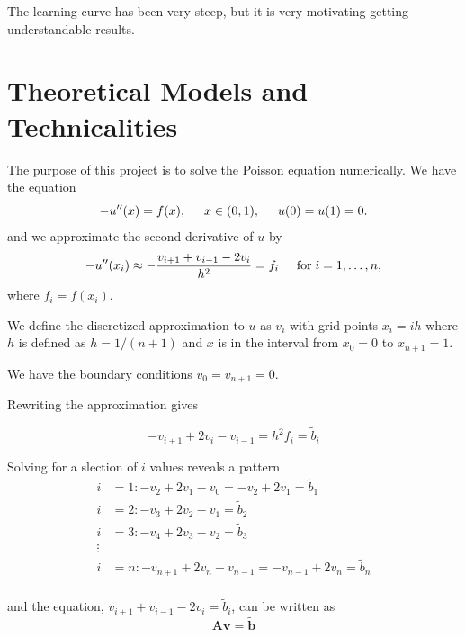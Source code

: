 \documentclass[%
oneside,                 %
final,                   %
10pt]{article}
\begin{document}
The learning curve has been very steep, but it is very motivating getting understandable results.


\section{Theoretical Models and Technicalities}

The purpose of this project is to solve the Poisson equation numerically. We have the equation
\begin{equation*}
-u''(x) = f(x), \hspace{0.5cm} x\in(0,1), \hspace{0.5cm} u(0) = u(1) = 0.
\end{equation*}
and we approximate the second derivative of $u$ by
\begin{equation*}
-u''(x_i)\approx -\frac{v_{i+1}+v_{i-1}-2v_i}{h^2} = f_i  \hspace{0.5cm} \mathrm{for} \hspace{0.1cm} i=1,\dots, n,
\end{equation*}
where $f_i=f(x_i)$.



We define the discretized approximation  to $u$ as $v_i$  with
grid points $x_i=ih$ where $h$ is defined as $h=1/(n+1)$ and $x$ is in the interval from $x_0=0$ to $x_{n+1}=1$.

We have the boundary conditions $v_0 = v_{n+1} = 0$.


Rewriting the approximation gives

\begin{equation*}
-v_{i+1}+2v_{i}-v_{i-1} = h^2f_i=\tilde{b}_i
\end{equation*}


Solving for a slection of $i$ values reveals a pattern\\
\begin{align*}
  i &=1: -v_{2}+2v_{1}-v_0 = -v_{2}+2v_1=\tilde{b}_1\\
  i &=2: -v_{3}+2v_{2}-v_1 = \tilde{b}_2\\
  i &=3: -v_{4}+2v_{3}-v_2 = \tilde{b}_3\\
  \vdots\\
  i &=n: -v_{n+1}+2v_n-v_{n-1} = -v_{n-1}+2v_{n}=\tilde{b}_n\\
\end{align*}

and the equation, $v_{i+1}+v_{i-1}-2v_i =\tilde{b}_i$, can be written as
$$\mathbf{Av}=\mathbf{\tilde{b}} $$\\
\end{document}
